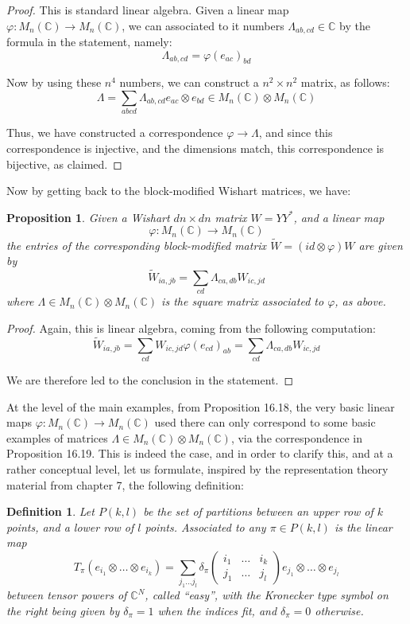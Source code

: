 \documentclass[12pt]{amsbook}
\newtheorem{definition}[theorem]{Definition}
\newtheorem{proposition}[theorem]{Proposition}
\begin{document}
\begin{proof}
This is standard linear algebra. Given a linear map $\varphi:M_n(\mathbb C)\to M_n(\mathbb C)$, we can associated to it numbers $\Lambda_{ab,cd}\in\mathbb C$ by the formula in the statement, namely:
$$\Lambda_{ab,cd}=\varphi(e_{ac})_{bd}$$

Now by using these $n^4$ numbers, we can construct a $n^2\times n^2$ matrix, as follows:
$$\Lambda=\sum_{abcd}\Lambda_{ab,cd}e_{ac}\otimes e_{bd}\in M_n(\mathbb C)\otimes M_n(\mathbb C)$$

Thus, we have constructed a correspondence $\varphi\to\Lambda$, and since this correspondence is injective, and the dimensions match, this correspondence is bijective, as claimed.
\end{proof}

Now by getting back to the block-modified Wishart matrices, we have:

\begin{proposition}
Given a Wishart $dn\times dn$ matrix $W=YY^*$, and a linear map
$$\varphi:M_n(\mathbb C)\to M_n(\mathbb C)$$
the entries of the corresponding block-modified matrix $\widetilde{W}=(id\otimes\varphi)W$ are given by
$$\widetilde{W}_{ia,jb}=\sum_{cd}\Lambda_{ca,db}W_{ic,jd}$$
where $\Lambda\in M_n(\mathbb C)\otimes M_n(\mathbb C)$ is the square matrix associated to $\varphi$, as above.
\end{proposition}

\begin{proof}
Again, this is linear algebra, coming from the following computation:
$$\widetilde{W}_{ia,jb}
=\sum_{cd}W_{ic,jd}\varphi(e_{cd})_{ab}
=\sum_{cd}\Lambda_{ca,db}W_{ic,jd}$$

We are therefore led to the conclusion in the statement.
\end{proof}

At the level of the main examples, from Proposition 16.18, the very basic linear maps $\varphi:M_n(\mathbb C)\to M_n(\mathbb C)$ used there can only correspond to some basic examples of matrices $\Lambda\in M_n(\mathbb C)\otimes M_n(\mathbb C)$, via the correspondence in Proposition 16.19. This is indeed the case, and in order to clarify this, and at a rather conceptual level, let us formulate, inspired by the representation theory material from chapter 7, the following definition:

\begin{definition}
Let $P(k,l)$ be the set of partitions between an upper row of $k$ points, and a lower row of $l$ points. Associated to any $\pi\in P(k,l)$ is the linear map
$$T_\pi(e_{i_1}\otimes\ldots\otimes e_{i_k})=\sum_{j_1\ldots j_l}\delta_\pi\begin{pmatrix}i_1&\ldots&i_k\\ j_1&\ldots&j_l\end{pmatrix}e_{j_1}\otimes\ldots\otimes e_{j_l}$$
between tensor powers of $\mathbb C^N$, called ``easy'', with the Kronecker type symbol on the right being given by $\delta_\pi=1$ when the indices fit, and $\delta_\pi=0$ otherwise.
\end{definition}
\end{document}
